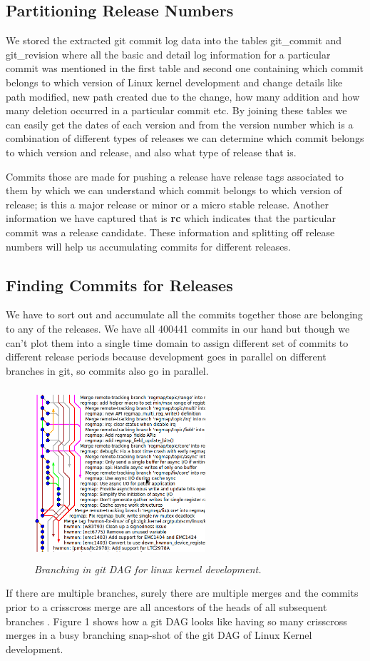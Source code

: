 \documentclass{acm_proc_article-sp}
\begin{document}
 \subsection{Partitioning Release Numbers}
We stored the extracted git commit log data into the tables git\_commit and git\_revision where all the basic and detail log information for a particular commit was mentioned in the first table and second one containing which commit belongs to which version of Linux kernel development and change details like path modified, new path created due to the change, how many addition and how many deletion occurred in a particular commit etc. By joining these tables we can easily get the dates of each version and from the version number which is a combination of different types of releases we can determine which commit belongs to which version and release, and also what type of release that is.

Commits those are made for pushing a release have release tags associated to them by which we can understand which commit belongs to which version of release; is this a major release or minor or a micro stable release. Another information we have captured that is \textbf{rc} which indicates that the particular commit was a release candidate. These information and splitting off release numbers will help us accumulating commits for different releases.

\subsection{Finding Commits for Releases}
We have to sort out and accumulate all the commits together those are belonging to any of the releases. We have all 400441 commits in our hand but though we can't plot them into a single time domain to assign different set of commits to different release periods because development goes in parallel on different branches in git, so commits also go in parallel.
\begin{figure}
\begin{center}
\includegraphics[height=2.5in,width=2.5in]{gitdag.png}
\caption{\small \sl Branching in git DAG for linux kernel development.}
\end{center}
\end{figure}
If there are multiple branches, surely there are multiple merges and the commits prior to a crisscross merge are all ancestors of the heads of all subsequent branches \cite{bird_git}. Figure 1 shows how a git DAG looks like having so many crisscross merges in a busy branching snap-shot of the git DAG of Linux Kernel development.
\end{document}

